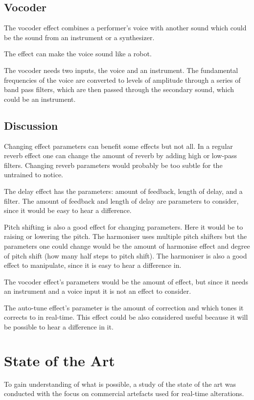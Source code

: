 \subsection{Vocoder}

The vocoder effect combines a performer's voice with another sound which could be the sound from an instrument or a synthesizer\citep{Vocoder_00}. 

The effect can make the voice sound like a robot. 

The vocoder needs two inputs, the voice and an instrument. The fundamental frequencies of the voice are converted to levels of amplitude through a series of band pass filters, which are then passed through the secondary sound, which could be an instrument.

\subsection{Discussion}

Changing effect parameters can benefit some effects but not all. In a regular reverb effect one can change the amount of reverb by adding high or low-pass filters. Changing reverb parameters would probably be too subtle for the untrained to notice.

The delay effect has the parameters: amount of feedback, length of delay, and a filter. The amount of feedback and length of delay are parameters to consider, since it would be easy to hear a difference. 

Pitch shifting is also a good effect for changing parameters. Here it would be to raising or lowering the pitch. The harmoniser uses multiple pitch shifters but the parameters one could change would be the amount of harmonise effect and degree of pitch shift (how many half steps to pitch shift). The harmoniser is also a good effect to manipulate, since it is easy to hear a difference in. 
   
The vocoder effect's parameters would be the amount of effect, but since it needs an instrument and a voice input it is not an effect to consider. 

The auto-tune effect's parameter is the amount of correction and which tones it corrects to in real-time. This effect could be also considered useful because it will be possible to hear a difference in it. 


\section{State of the Art}
To gain understanding of what is possible, a study of the state of the art was conducted with the focus on commercial artefacts used for real-time alterations.

